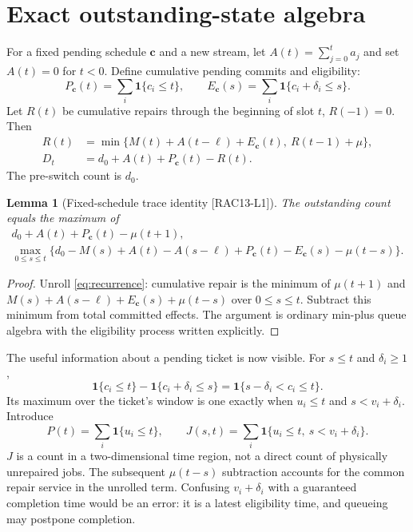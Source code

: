 \documentclass[11pt,a4paper]{article}
\newtheorem{lemma}[theorem]{Lemma}\newtheorem{corollary}[theorem]{Corollary}
\theoremstyle{definition}\newtheorem{definition}{Definition}
\newcommand{\idtag}[1]{\textnormal{\textsf{[#1]}}}
\newcommand{\one}{\mathbf 1}
\begin{document}
\section{Exact outstanding-state algebra}
\label{sec:trace}
For a fixed pending schedule $\mathbf c$ and a new stream, let $A(t)=\sum_{j=0}^{t}a_j$ and set $A(t)=0$ for $t<0$. Define cumulative pending commits and eligibility:
\begin{equation}
P_{\mathbf c}(t)=\sum_i\one\{c_i\le t\},\qquad
E_{\mathbf c}(s)=\sum_i\one\{c_i+\delta_i\le s\}.
\end{equation}
Let $R(t)$ be cumulative repairs through the beginning of slot $t$, $R(-1)=0$. Then
\begin{align}
R(t)&=\min\{M(t)+A(t-\ell)+E_{\mathbf c}(t),\ R(t-1)+\mu\},\label{eq:recurrence}\\
D_t&=d_0+A(t)+P_{\mathbf c}(t)-R(t).
\end{align}
The pre-switch count is $d_0$.

\begin{lemma}[Fixed-schedule trace identity \idtag{RAC13-L1}]
\label{lem:trace}
The outstanding count equals the maximum of
\begin{align}
d_0+A(t)+P_{\mathbf c}(t)-\mu(t+1),\label{eq:prefix-trace}\\
\max_{0\le s\le t}\{d_0-M(s)+A(t)-A(s-\ell)
+P_{\mathbf c}(t)-E_{\mathbf c}(s)-\mu(t-s)\}.\label{eq:interval-trace}
\end{align}
\end{lemma}
\begin{proof}
Unroll \cref{eq:recurrence}: cumulative repair is the minimum of $\mu(t+1)$ and $M(s)+A(s-\ell)+E_{\mathbf c}(s)+\mu(t-s)$ over $0\le s\le t$. Subtract this minimum from total committed effects. The argument is ordinary min-plus queue algebra with the eligibility process written explicitly.
\end{proof}
The useful information about a pending ticket is now visible. For $s\le t$ and $\delta_i\ge1$,
\begin{equation}
\one\{c_i\le t\}-\one\{c_i+\delta_i\le s\}
=\one\{s-\delta_i<c_i\le t\}.
\label{eq:indicator}
\end{equation}
Its maximum over the ticket's window is one exactly when $u_i\le t$ and $s<v_i+\delta_i$. Introduce
\begin{equation}
P(t)=\sum_i\one\{u_i\le t\},\qquad
J(s,t)=\sum_i\one\{u_i\le t,\ s<v_i+\delta_i\}.
\label{eq:PJ}
\end{equation}
$J$ is a count in a two-dimensional time region, not a direct count of physically unrepaired jobs. The subsequent $\mu(t-s)$ subtraction accounts for the common repair service in the unrolled term. Confusing $v_i+\delta_i$ with a guaranteed completion time would be an error: it is a latest eligibility time, and queueing may postpone completion.
\end{document}
